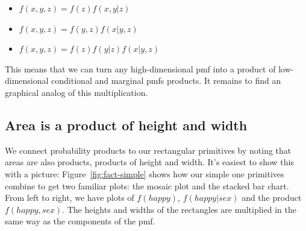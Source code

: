 \documentclass[journal]{vgtc}
\begin{document}

\begin{itemize}
  \setlength{\itemsep}{0em}
  \item $f(x, y, z) = f(z) f(x, y | z)$
  \item $f(x, y, z) = f(y, z) f(x | y, z) $
  \item $f(x, y, z) = f(z) f(y | z) f(x | y, z)$
\end{itemize}

This means that we can turn any high-dimensional {\sc pmf} into a product of low-dimensional conditional and marginal {\sc pmf}s products. It remains to find an graphical analog of this multiplication. 

\subsection{Area is a product of height and width}

We connect probability products to our rectangular primitives by noting that areas are also products, products of height and width. It's easiest to show this with a picture: Figure~\ref{fig:fact-simple} shows how our simple one primitives combine to get two familiar plots: the mosaic plot and the stacked bar chart. From left to right, we have plots of $f(happy)$, $f(happy | sex)$ and the product $f(happy, sex)$. The heights and widths of the rectangles are multiplied in the same way as the components of the {\sc pmf}.
\end{document}
